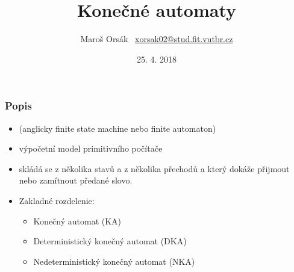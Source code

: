 \documentclass{beamer}
\title{Konečné automaty}
\author{\texorpdfstring{Maroš Orsák \ \newline\url{xorsak02@stud.fit.vutbr.cz}}{Author}}
\institute{Vysoké učenie technické v~Brně \\Fakulta informačných technológií}
\date{25. 4. 2018}
\begin{document}
\begin{frame}
\titlepage
\end{frame}


\begin{frame}
\frametitle{Popis}
\begin{itemize}
\item (anglicky finite state machine nebo finite automaton) 
\item  výpočetní model primitivního počítače
\item  skládá se z několika stavů a z několika přechodů a který dokáže přijmout nebo zamítnout předané 
slovo.
\item{Zakladné rozdelenie:}
\begin{itemize}
\item{Konečný automat (KA)}
\item{Deterministický konečný automat (DKA)}
\item{Nedeterministický konečný automat (NKA)}
\end{itemize}
\end{itemize}
\end{frame}
\end{document}
